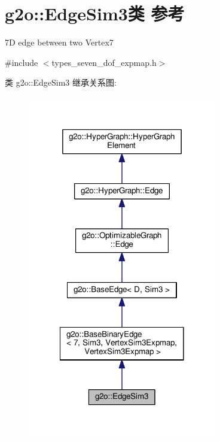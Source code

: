 \hypertarget{classg2o_1_1EdgeSim3}{\section{g2o\-:\-:Edge\-Sim3类 参考}
\label{classg2o_1_1EdgeSim3}
}


7\-D edge between two Vertex7  




{\ttfamily \#include $<$types\-\_\-seven\-\_\-dof\-\_\-expmap.\-h$>$}



类 g2o\-:\-:Edge\-Sim3 继承关系图\-:
\nopagebreak
\begin{figure}[H]
\begin{center}
\leavevmode
\includegraphics[width=234pt]{classg2o_1_1EdgeSim3__inherit__graph}
\end{center}
\end{figure}


